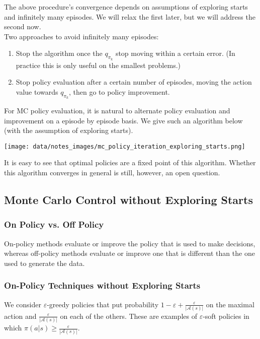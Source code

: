 The above procedure's convergence depends on assumptions of exploring starts and infinitely many episodes. We will relax the first later, but we will address the second now.\\

Two approaches to avoid infinitely many episodes:
\begin{enumerate}
    \item Stop the algorithm once the $q_{\pi_k}$ stop moving within a certain error. (In practice this is only useful on the smallest problems.)
    \item Stop policy evaluation after a certain number of episodes, moving the action value towards $q_{\pi_k}$, then go to policy improvement.
\end{enumerate}

For MC policy evaluation, it is natural to alternate policy evaluation and improvement on a episode by episode basis. We give such an algorithm below (with the assumption of exploring starts).

\texttt{[image: data/notes\_images/mc\_policy\_iteration\_exploring\_starts.png]}

It is easy to see that optimal policies are a fixed point of this algorithm. Whether this algorithm converges in general is still, however, an open question.

\subsection{Monte Carlo Control without Exploring Starts}
\subsubsection*{On Policy vs. Off Policy}
On-policy methods evaluate or improve the policy that is used to make decisions, whereas off-policy methods evaluate or improve one that is different than the one used to generate the data.

\subsubsection*{On-Policy Techniques without Exploring Starts}
We consider $\varepsilon$-greedy policies that put probability $1 - \varepsilon + \frac{\varepsilon}{|\mathcal{A}(s)|}$ on the maximal action and $\frac{\varepsilon}{|\mathcal{A}(s)|}$ on each of the others. These are examples of $\varepsilon$-soft policies in which $\pi(a|s) \geq \frac{\varepsilon}{|\mathcal{A}(s)|}$.\\

